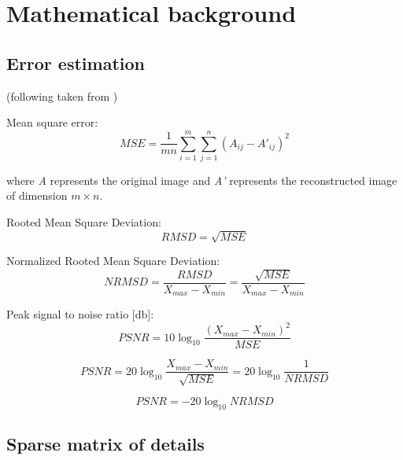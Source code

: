 \section{Mathematical background}
\label{sec:math}



\subsection{Error estimation}
\label{sec:error}


(following taken from \cite{SairaBanu2015})

Mean square error:
\begin{equation}
MSE=\frac{1}{m n} \sum_{i=1}^{m} \sum_{j=1}^{n} (A_{ij} - A'_{ij})^{2}
\label{eq:mse-def}
\end{equation}

where \textit{A} represents the original image and \textit{A'} represents the
reconstructed image of dimension $m \times n$.

Rooted Mean Square Deviation:
\begin{equation}
RMSD=\sqrt{MSE}
\label{eq:rmsd-def}
\end{equation}

Normalized Rooted Mean Square Deviation:
\begin{equation}
NRMSD=\frac{RMSD}{X_{max}-X_{min}}=\frac{\sqrt{MSE}}{X_{max}-X_{min}}
\label{eq:nrmsd-def}
\end{equation}

Peak signal to noise ratio [db]:
\begin{equation}
PSNR=10\log_{10}\frac{(X_{max}-X_{min})^{2}}{MSE}
\end{equation}

\begin{equation}
PSNR=20\log_{10}\frac{X_{max}-X_{min}}{\sqrt{MSE}}=20\log_{10}\frac{1}{NRMSD}
\end{equation}

\begin{equation}
PSNR=-20\log_{10}NRMSD
\label{eq:psnr-def}
\end{equation}

\subsection{Sparse matrix of details}

